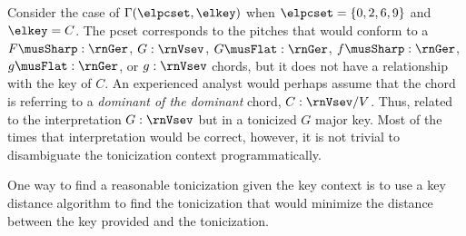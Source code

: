 
Consider the case of $\Gamma(\elpcset, \elkey)$ when
$\elpcset = \{0, 2, 6, 9\}$ and $\elkey = C$. The
\gls{pcset} corresponds to the pitches that would conform to
a $F\musSharp:\rnGer$, $G:\rnVsev$, $G\musFlat:\rnGer$,
$f\musSharp:\rnGer$, $g\musFlat:\rnGer$, or $g:\rnVsev$
chords, but it does not have a relationship with the key of
$C$. An experienced analyst would perhaps assume that the
chord is referring to a \emph{dominant of the dominant}
chord, $C:\rnVsev/V$. Thus, related to the interpretation
$G:\rnVsev$ but in a tonicized $G$ major key. Most of the
times that interpretation would be correct, however, it is
not trivial to disambiguate the tonicization context
programmatically.

One way to find a reasonable tonicization given the key
context is to use a key distance algorithm to find the
tonicization that would minimize the distance between the
key provided and the tonicization.
